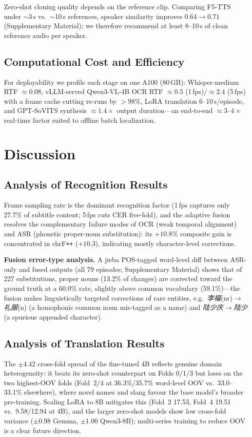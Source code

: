 \documentclass[journal]{IEEEtran}
\begin{document}
Zero-shot cloning quality depends on the reference clip.
Comparing F5-TTS under $\sim$3\,s vs.\ $\sim$10\,s references, speaker similarity improves $0.64\to0.71$ (Supplementary Material); we therefore recommend at least 8--10\,s of clean reference audio per speaker.



\subsection{Computational Cost and Efficiency}
For deployability we profile each stage on one A100 (80\,GB): Whisper-medium RTF $\approx0.08$, vLLM-served Qwen3-VL-4B OCR RTF $\approx0.5$ (1\,fps)/$\approx2.4$ (5\,fps) with a frame cache cutting re-runs by ${>}98\%$, LoRA translation 6--10\,s/episode, and GPT-SoVITS synthesis $\approx1.4\times$ output duration---an end-to-end $\approx3$--$4\times$ real-time factor suited to offline batch localization.

\section{Discussion}
\label{sec:discussion}

\subsection{Analysis of Recognition Results}
Frame sampling rate is the dominant recognition factor (1\,fps captures only 27.7\% of subtitle content; 5\,fps cuts CER five-fold), and the adaptive fusion resolves the complementary failure modes of OCR (weak temporal alignment) and ASR (phonetic proper-noun substitution): its $+10.8\%$ composite gain is concentrated in chrF\texttt{++} ($+10.3$), indicating mostly character-level corrections.

\textbf{Fusion error-type analysis.}
A jieba POS-tagged word-level diff between ASR-only and fused outputs (all 79 episodes; Supplementary Material) shows that of 227 substitutions, proper nouns (13.2\% of changes) are corrected toward the ground truth at a 60.0\% rate, slightly above common vocabulary (59.1\%)---the fusion makes linguistically targeted corrections of rare entities, e.g.\ \emph{李福}(nr)$\to$\emph{礼服}(n) (a homophonic common noun mis-tagged as a name) and \emph{陆少庆}$\to$\emph{陆少} (a spurious appended character).



\subsection{Analysis of Translation Results}
\label{sec:discussion_translation}
The $\pm4.42$ cross-fold spread of the fine-tuned 4B reflects genuine domain heterogeneity: it beats its zero-shot counterpart on Folds 0/1/3 but loses on the two highest-OOV folds (Fold~2/4 at 36.3\%/35.7\% word-level OOV vs.\ 33.0--33.1\% elsewhere), where novel names and slang favour the base model's broader pre-training.
Scaling LoRA to 8B mitigates this (Fold~2 17.53, Fold~4 19.51 vs.\ 9.58/12.94 at 4B), and the larger zero-shot models show low cross-fold variance ($\pm0.98$ Gemma, $\pm1.00$ Qwen3-8B); multi-series training to reduce OOV is a clear future direction.
\end{document}
